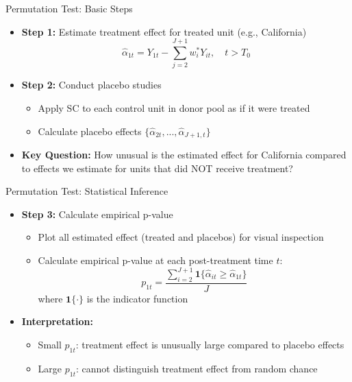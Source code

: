 \documentclass[hyperref={pdfpagelabels=false}]{beamer}
\begin{document}
\begin{frame}{Permutation Test: Basic Steps}
	\begin{itemize}
		\item \textbf{Step 1:} Estimate treatment effect for treated unit (e.g., California)
		\begin{equation*}
			\hat{\alpha}_{1t} = Y_{1t} - \sum_{j=2}^{J+1} w_i^* Y_{it}, \quad t > T_0
\end{equation*}
		\vspace{0.2cm}
		\item \textbf{Step 2:} Conduct placebo studies
				\vspace{0.2cm}
		\begin{itemize}
			\item Apply SC to each control unit in donor pool as if it were treated
					\vspace{0.2cm}
			\item Calculate placebo effects $\{\hat{\alpha}_{2t},...,\hat{\alpha}_{J+1,t}\}$
		\end{itemize}
		\vspace{0.2cm}
		\item \textbf{Key Question:} How unusual is the estimated effect for California compared to effects we estimate for units that did NOT receive treatment?
	\end{itemize}
\end{frame}

\begin{frame}{Permutation Test: Statistical Inference}
	\begin{itemize}
		\item \textbf{Step 3:} Calculate empirical p-value
		\begin{itemize}
			\item Plot all estimated effect (treated and placebos) for visual inspection
			\vspace{0.2cm}
			\item Calculate empirical p-value at each post-treatment time $t$:
			\begin{equation*}
				p_{1t}=\dfrac{\sum^{J+1}_{i=2}\mathbf{1}\{\hat{\alpha}_{it}\geq\hat{\alpha}_{1t}\}}{J}
\end{equation*}
			where $\mathbf{1}\{\cdot\}$ is the indicator function
		\end{itemize}
		\vspace{0.2cm}
		\item \textbf{Interpretation:} 
		\begin{itemize}
			\item Small $p_{1t}$: treatment effect is unusually large compared to placebo effects
					\vspace{0.2cm}
			\item Large $p_{1t}$: cannot distinguish treatment effect from random chance
		\end{itemize}
	\end{itemize}
\end{frame}
\end{document}
